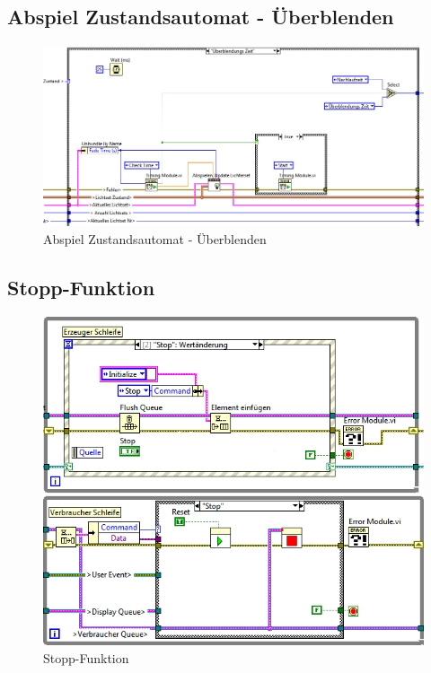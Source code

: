 	\subsection{Abspiel Zustandsautomat - Überblenden}
	\begin{figure}[h!]
	\centering
		\includegraphics[angle=90, height=0.8\textheight ]{Pics/automat-fade.png}
	\caption{Abspiel Zustandsautomat - Überblenden}
	\label{fig:a9}
	\end{figure}
	\newpage	
	
	\subsection{Stopp-Funktion}
	\begin{figure}[h!]
	\centering
		\includegraphics[width=\textwidth]{Pics/stop.png}
	\caption{Stopp-Funktion}
	\label{fig:a10}
	\end{figure}
	
